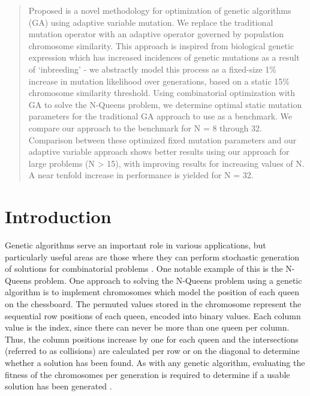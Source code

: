 \documentclass{sig-alternate}
\begin{document}
\maketitle
\begin{abstract}
Proposed is a novel methodology for optimization of genetic algorithms (GA) using adaptive variable mutation. We replace the traditional mutation operator with an adaptive operator governed by population chromosome similarity. This approach is inspired from biological genetic expression which has increased incidences of genetic mutations as a result of `inbreeding' - we abstractly model this process as a fixed-size 1\% increase in mutation likelihood over generations, based on a static 15\% chromosome similarity threshold. Using combinatorial optimization with GA to solve the N-Queens problem, we determine optimal static mutation parameters for the traditional GA approach to use as a benchmark. We compare our approach to the benchmark for N = 8 through 32. Comparison between these optimized fixed mutation parameters and our adaptive variable approach shows better results using our approach for large problems (N > 15), with improving results for increasing values of N. A near tenfold increase in performance is yielded for N = 32.
\end{abstract}


% 
%
\section{Introduction}
Genetic algorithms serve an important role in various applications, but particularly useful areas are those where they can perform stochastic generation of solutions for combinatorial problems \cite{de1989using,crawford1992solving}. One notable example of this is the N-Queens problem. One approach to solving the N-Queens problem using a genetic algorithm is to implement chromosomes which model the position of each queen on the chessboard. The permuted values stored in the chromosome represent the sequential row positions of each queen, encoded into binary values. Each column value is the index, since there can never be more than one queen per column. Thus, the column positions increase by one for each queen and the intersections (referred to as collisions) are calculated per row or on the diagonal to determine whether a solution has been found. As with any genetic algorithm, evaluating the fitness of the chromosomes per generation is required to determine if a usable solution has been generated \cite{srinivas1994genetic}. 
\end{document}
